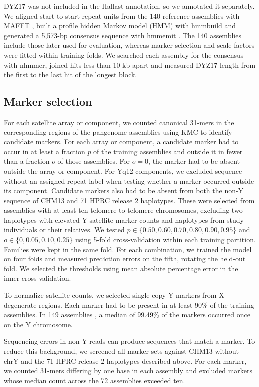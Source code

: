 DYZ17 was not included in the Hallast annotation, so we annotated it separately. We aligned start-to-start repeat units from the 140 reference assemblies with MAFFT \cite{Katoh2013}, built a profile hidden Markov model (HMM) with hmmbuild and generated a 5,573-bp consensus sequence with hmmemit \cite{Eddy2011}. The 140 assemblies include those later used for evaluation, whereas marker selection and scale factors were fitted within training folds. We searched each assembly for the consensus with nhmmer, joined hits less than 10 kb apart and measured DYZ17 length from the first to the last hit of the longest block.

\subsection{Marker selection}\label{sec:m-markers}
For each satellite array or component, we counted canonical 31-mers in the corresponding regions of the pangenome assemblies using KMC \cite{Kokot2017} to identify candidate markers. For each array or component, a candidate marker had to occur in at least a fraction $p$ of the training assemblies and outside it in fewer than a fraction $o$ of those assemblies. For $o=0$, the marker had to be absent outside the array or component. For Yq12 components, we excluded sequence without an assigned repeat label when testing whether a marker occurred outside its component. Candidate markers also had to be absent from both the non-Y sequence of CHM13 \cite{Nurk2022} and 71 HPRC release 2 haplotypes. These were selected from assemblies with at least ten telomere-to-telomere chromosomes, excluding two haplotypes with elevated Y-satellite marker counts and haplotypes from study individuals or their relatives. We tested $p\in\{0.50,0.60,0.70,0.80,0.90,0.95\}$ and $o\in\{0,0.05,0.10,0.25\}$ using 5-fold cross-validation within each training partition. Families were kept in the same fold. For each combination, we trained the model on four folds and measured prediction errors on the fifth, rotating the held-out fold. We selected the thresholds using mean absolute percentage error in the inner cross-validation.

To normalize satellite counts, we selected single-copy Y markers from X-degenerate regions. Each marker had to be present in at least 90\% of the training assemblies. In 149 assemblies \cite{Hallast2026,Lucas2026}, a median of 99.49\% of the markers occurred once on the Y chromosome.

Sequencing errors in non-Y reads can produce sequences that match a marker. To reduce this background, we screened all marker sets against CHM13 without chrY and the 71 HPRC release 2 haplotypes described above. For each marker, we counted 31-mers differing by one base in each assembly and excluded markers whose median count across the 72 assemblies exceeded ten.


